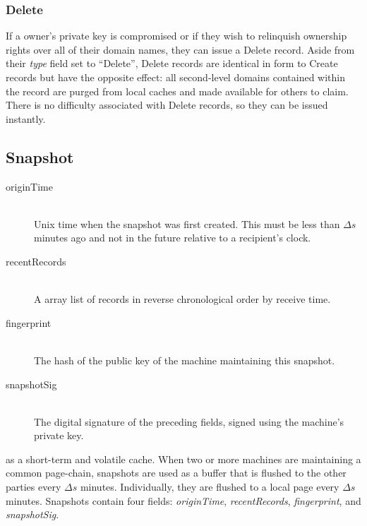 \subsubsection{Delete}


If a owner's private key is compromised or if they wish to relinquish ownership rights over all of their domain names, they can issue a Delete record. Aside from their \emph{type} field set to ``Delete'', Delete records are identical in form to Create records but have the opposite effect: all second-level domains contained within the record are purged from local caches and made available for others to claim. There is no difficulty associated with Delete records, so they can be issued instantly.


\subsection{Snapshot}

\begin{description}
	\item[originTime] \hfill \\
		Unix time when the snapshot was first created. This must be less than $ \Delta s $ minutes ago and not in the future relative to a recipient's clock.
	\item[recentRecords] \hfill \\
		A array list of records in reverse chronological order by receive time.
	\item[fingerprint] \hfill \\
		The hash of the public key of the machine maintaining this snapshot.
	\item[snapshotSig] \hfill \\
		The digital signature of the preceding fields, signed using the machine's private key.
\end{description}
		
		
		as a short-term and volatile cache. When two or more machines are maintaining a common page-chain, snapshots are used as a buffer that is flushed to the other parties every $ \Delta s $ minutes. Individually, they are flushed to a local page every $ \Delta s $ minutes. Snapshots contain four fields: \emph{originTime}, \emph{recentRecords}, \emph{fingerprint}, and \emph{snapshotSig}.

